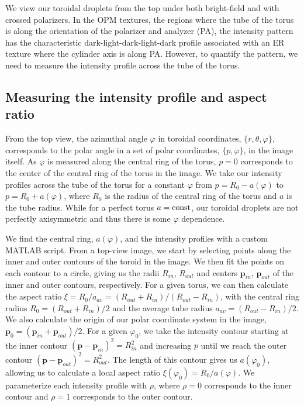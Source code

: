 We view our toroidal droplets from the top under both bright-field and with crossed polarizers.
In the OPM textures, the regions where the tube of the torus is along the orientation of the polarizer and analyzer (PA), the intensity pattern has the characteristic dark-light-dark-light-dark profile associated with an ER texture where the cylinder axis is along PA.
However, to quantify the pattern, we need to measure the intensity profile across the tube of the torus.

\subsection{Measuring the intensity profile and aspect ratio}
From the top view, the azimuthal angle $\varphi$ in toroidal coordinates, $\{r,\theta,\varphi \}$, corresponds to the polar angle in a set of polar coordinates, $\{p,\varphi \}$, in the image itself.
As $\varphi$ is measured along the central ring of the torus, $p = 0$ corresponds to the center of the central ring of the torus in the image.
We take our intensity profiles across the tube of the torus for a constant $\varphi$ from $p = R_0 - a(\varphi)$ to $p = R_0+ a(\varphi)$, where $R_0$ is the radius of the central ring of the torus and $a$ is the tube radius.
While for a perfect torus $a = {\rm const}$, our toroidal droplets are not perfectly axisymmetric and thus there is some $\varphi$ dependence.

We find the central ring, $a(\varphi)$, and the intensity profiles with a custom MATLAB script.
From a top-view image, we start by selecting points along the inner and outer contours of the toroid in the image.
We then fit the points on each contour to a circle, giving us the radii $R_{in}$, $R_{out}$ and centers $\mathbf{p}_{in}$, $\mathbf{p}_{out}$ of the inner and outer contours, respectively.
For a given torus, we can then calculate the aspect ratio $\xi = R_0/a_{av} = (R_{out}+R_{in})/(R_{out}-R_{in})$, with the central ring radius $R_0=(R_{out}+R_{in})/2$ and the average tube radius $a_{av} = (R_{out}-R_{in})/2$.
We also calculate the origin of our polar coordinate system in the image, $\mathbf{p}_0 = (\mathbf{p}_{in}+\mathbf{p}_{out})/2$.
For a given $\varphi_0$, we take the intensity contour starting at the inner contour $(\mathbf{p}-\mathbf{p}_{in})^2 = R^2_{in}$ and increasing $p$ until we reach the outer contour $(\mathbf{p}-\mathbf{p}_{out})^2 = R^2_{out}$.
The length of this contour gives us $a(\varphi_0)$, allowing us to calculate a local aspect ratio $\xi(\varphi_0) = R_0/a(\varphi)$.
We parameterize each intensity profile with $\rho$, where $\rho = 0$ corresponds to the inner contour and $\rho = 1$ corresponds to the outer contour.


